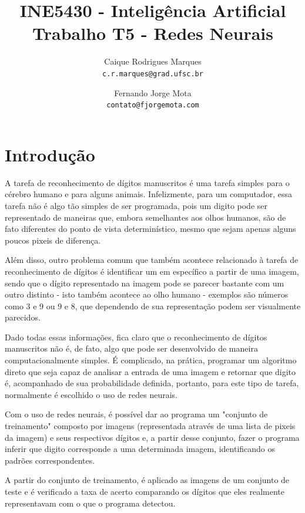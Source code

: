 \documentclass{article}
\title{\textbf{INE5430 - Inteligência Artificial \\
        \large Trabalho T5 - Redes Neurais}}
\author{
    Caique Rodrigues Marques \\
    {\texttt{c.r.marques@grad.ufsc.br}}
    \and
    Fernando Jorge Mota \\
    {\texttt{contato@fjorgemota.com}}
    \vspace{-5mm}
}
\date{}
\begin{document}
    \maketitle
    
    \section*{Introdução}
        A tarefa de reconhecimento de dígitos manuscritos é uma tarefa simples
        para o cérebro humano e para alguns animais. Infelizmente, para um
        computador, essa tarefa não é algo tão simples de ser programada, pois
        um digito pode ser representado de maneiras que, embora semelhantes aos
        olhos humanos, são de fato diferentes do ponto de vista determinístico,
        mesmo que sejam apenas alguns poucos pixeis de diferença.
        
        Além disso, outro problema comum que também acontece relacionado à
        tarefa de reconhecimento de dígitos é identificar um em específico a
        partir de uma imagem, sendo que o dígito representado na imagem pode se
        parecer bastante com um outro distinto - isto também acontece ao olho
        humano - exemplos são números como 3 e 9 ou 9 e 8, que dependendo de
        sua representação podem ser visualmente parecidos.
        
        Dado todas essas informações, fica claro que o reconhecimento de
        dígitos manuscritos não é, de fato, algo que pode ser desenvolvido de
        maneira computacionalmente simples. É complicado, na prática, programar
        um algoritmo direto que seja capaz de analisar a entrada de uma imagem
        e retornar que digito é, acompanhado de sua probabilidade definida,
        portanto, para este tipo de tarefa, normalmente é escolhido o uso de
        redes neurais.
        
        Com o uso de redes neurais, é possível dar ao programa um "conjunto de
        treinamento" composto por imagens (representada através de uma lista de
        pixeis da imagem) e seus respectivos dígitos e, a partir desse
        conjunto, fazer o programa inferir que digito corresponde a uma
        determinada imagem, identificando os padrões correspondentes.
        
        A partir do conjunto de treinamento, é aplicado as imagens de um
        conjunto de teste e é verificado a taxa de acerto comparando os dígitos
        que eles realmente representavam com o que o programa detectou.
    
\end{document}
